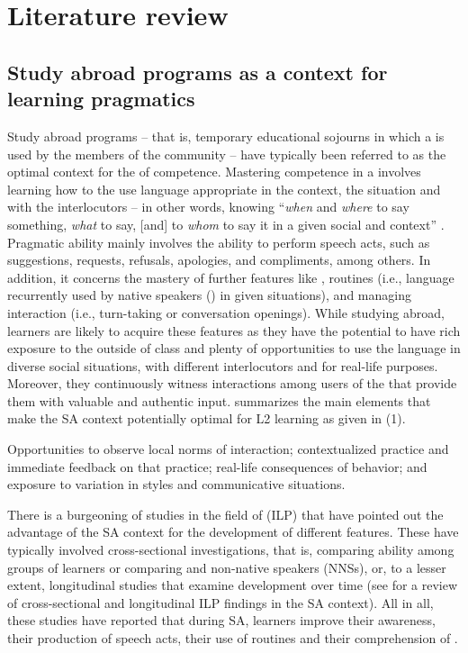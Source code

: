 \documentclass[output=paper]{langsci/langscibook}
\begin{document}
\section{Literature review}
\largerpage
\subsection{Study abroad programs as a context for learning pragmatics}
Study abroad programs – that is, temporary educational sojourns in which a  is used by the members of the community \citep{Taguchi2015contextually} – have typically been referred to as the optimal context for the  of  competence. Mastering  competence in a  involves learning how to the use language appropriate in the context, the situation and with the interlocutors – in other words, knowing “\textit{when} and \textit{where} to say something, \textit{what} to say, [and] to \textit{whom} to say it in a given social and  context” \citep[314]{García1989}. Pragmatic ability mainly involves the ability to perform speech acts, such as suggestions, requests, refusals, apologies, and compliments, among others. In addition, it concerns the mastery of  further features like ,  routines (i.e.,  language recurrently used by native speakers () in given situations), and managing interaction (i.e., turn-taking or conversation openings).  While studying abroad, learners are likely to acquire these features as they have the potential to have rich exposure to the  outside of class and plenty of opportunities to use the language in diverse social situations, with different interlocutors and for real-life purposes. Moreover, they continuously witness interactions among users of the  that provide them with valuable and authentic input.  \citet[4]{Taguchi2015contextually} summarizes the main elements that make the SA context potentially optimal for L2  learning as given in (1).

\ea%
  \ea Opportunities to observe local norms of interaction; 
  \ex contextualized  practice and immediate feedback on that practice;
  \ex real-life consequences of  behavior; and 
  \ex exposure to variation in styles and communicative situations.
  \z
\z
    
There is a burgeoning of studies in the field of   (ILP) that have pointed out the advantage of the SA context for the development of different  features. These have typically involved cross-sectional investigations, that is, comparing  ability among groups of  learners or comparing   and non-native speakers ({NNSs}), or, to a lesser extent, longitudinal studies that examine  development over time (see \citealt{Alcón-Soler2014} for a review of cross-sectional and longitudinal ILP findings in the SA context). All in all, these studies have reported that during SA, learners improve their  awareness, their production of speech acts, their use of  routines and their comprehension of . 
\end{document}
